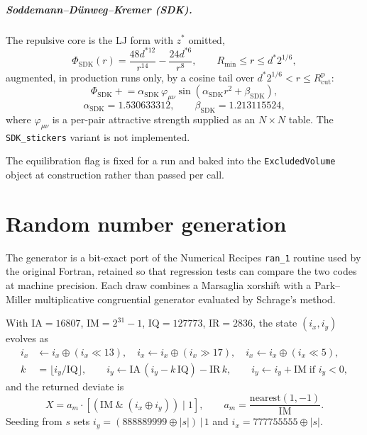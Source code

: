 \documentclass[11pt,a4paper]{report}
\newcommand{\code}[1]{\texttt{\seqsplitcode{#1}}}
\newcommand{\seqsplitcode}[1]{#1}
\begin{document}
\paragraph{Soddemann--D\"{u}nweg--Kremer (SDK).} The repulsive core is the LJ form
with $z^{*}$ omitted,
\begin{equation}
  \Phi_{\mathrm{SDK}}(r) = \frac{48 d^{*12}}{r^{14}} - \frac{24 d^{*6}}{r^{8}},
  \qquad R_{\min}\le r \le d^{*}2^{1/6},
\end{equation}
augmented, in production runs only, by a cosine tail over
$d^{*}2^{1/6} < r \le R_{\mathrm{cut}}^{\mathrm{p}}$:
\begin{equation}
  \Phi_{\mathrm{SDK}} \mathrel{+}= \alpha_{\mathrm{SDK}}\,\varphi_{\mu\nu}
    \sin\!\left(\alpha_{\mathrm{SDK}} r^{2} + \beta_{\mathrm{SDK}}\right),
\end{equation}
\begin{equation}
  \alpha_{\mathrm{SDK}} = 1.530633312, \qquad \beta_{\mathrm{SDK}} = 1.213115524 ,
\end{equation}
where $\varphi_{\mu\nu}$ is a per-pair attractive strength supplied as an
$N\times N$ table. The \code{SDK\_stickers} variant is not implemented.

The equilibration flag is fixed for a run and baked into the
\code{ExcludedVolume} object at construction rather than passed per call.

\chapter{Random number generation}
\label{ch:rng}

The generator is a bit-exact port of the Numerical Recipes \code{ran\_1} routine
used by the original Fortran, retained so that regression tests can compare the
two codes at machine precision. Each draw combines a Marsaglia xorshift with a
Park--Miller multiplicative congruential generator evaluated by Schrage's method.

With $\mathrm{IA}=16807$, $\mathrm{IM}=2^{31}-1$, $\mathrm{IQ}=127773$,
$\mathrm{IR}=2836$, the state $(i_x, i_y)$ evolves as
\begin{align}
  i_x &\leftarrow i_x \oplus (i_x \ll 13), \quad
  i_x \leftarrow i_x \oplus (i_x \gg 17), \quad
  i_x \leftarrow i_x \oplus (i_x \ll 5), \\
  k &= \lfloor i_y/\mathrm{IQ}\rfloor, \qquad
  i_y \leftarrow \mathrm{IA}\,(i_y - k\,\mathrm{IQ}) - \mathrm{IR}\,k,
  \qquad i_y \leftarrow i_y + \mathrm{IM}\;\text{if } i_y<0,
\end{align}
and the returned deviate is
\begin{equation}
  X = a_m \cdot \left[\left(\mathrm{IM} \;\&\; (i_x \oplus i_y)\right) \;|\; 1\right],
  \qquad
  a_m = \frac{\mathrm{nearest}(1,-1)}{\mathrm{IM}} .
\end{equation}
Seeding from $s$ sets $i_y = (888889999 \oplus |s|)\,|\,1$ and
$i_x = 777755555 \oplus |s|$.
\end{document}
